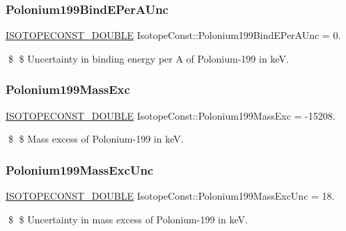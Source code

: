 \subsubsection{\texorpdfstring{Polonium199\+Bind\+E\+Per\+A\+Unc}{Polonium199BindEPerAUnc}}
{\footnotesize\ttfamily \mbox{\hyperlink{group___isotope_const-_macros_ga8f45a7272ce02c0b4c65c44636ed719a}{I\+S\+O\+T\+O\+P\+E\+C\+O\+N\+S\+T\+\_\+\+D\+O\+U\+B\+LE}} Isotope\+Const\+::\+Polonium199\+Bind\+E\+Per\+A\+Unc = 0.}

\$ \$ Uncertainty in binding energy per A of Polonium-\/199 in keV. \mbox{\label{group___isotope_const-_polonium-_po199_ga266d50e6471043410c17f90ea4519eb5}} 
\subsubsection{\texorpdfstring{Polonium199\+Mass\+Exc}{Polonium199MassExc}}
{\footnotesize\ttfamily \mbox{\hyperlink{group___isotope_const-_macros_ga8f45a7272ce02c0b4c65c44636ed719a}{I\+S\+O\+T\+O\+P\+E\+C\+O\+N\+S\+T\+\_\+\+D\+O\+U\+B\+LE}} Isotope\+Const\+::\+Polonium199\+Mass\+Exc = -\/15208.}

\$ \$ Mass excess of Polonium-\/199 in keV. \mbox{\label{group___isotope_const-_polonium-_po199_ga05dd1c06a70bb699a65236b42259db52}} 
\subsubsection{\texorpdfstring{Polonium199\+Mass\+Exc\+Unc}{Polonium199MassExcUnc}}
{\footnotesize\ttfamily \mbox{\hyperlink{group___isotope_const-_macros_ga8f45a7272ce02c0b4c65c44636ed719a}{I\+S\+O\+T\+O\+P\+E\+C\+O\+N\+S\+T\+\_\+\+D\+O\+U\+B\+LE}} Isotope\+Const\+::\+Polonium199\+Mass\+Exc\+Unc = 18.}

\$ \$ Uncertainty in mass excess of Polonium-\/199 in keV. \mbox{\label{group___isotope_const-_polonium-_po199_ga467fc47eedb1709df274018fc9636d19}} 
